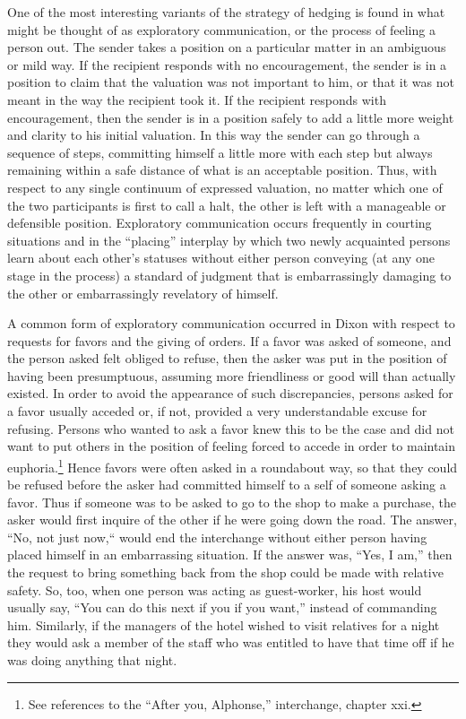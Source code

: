 \documentclass[twoside,symmetric,nobib,justified]{tufte-book}
\begin{document}
One of the most interesting variants of the strategy of hedging is found
in what might be thought of as exploratory communication, or the process
of feeling a person out. The sender takes a position on a particular
matter in an ambiguous or mild way. If the recipient responds with no
encouragement, the sender is in a position to claim that the valuation
was not important to him, or that it was not meant in the way the
recipient took it. If the recipient responds with encouragement, then
the sender is in a position safely to add a little more weight and
clarity to his initial valuation. In this way the sender can go through
a sequence of steps, committing himself a little more with each step but
always remaining within a safe distance of what is an acceptable
position. Thus, with respect to any single continuum of expressed
valuation, no matter which one of the two participants is first to call
a halt, the other is left with a manageable or defensible position.
Exploratory communication occurs frequently in courting situations and
in the ``placing'' interplay by which two newly acquainted persons learn
about each other's statuses without either person conveying (at any one
stage in the process) a standard of judgment that is embarrassingly
damaging to the other or embarrassingly revelatory of himself.

A common form of exploratory communication occurred in Dixon with
respect to requests for favors and the giving of orders. If a favor was
asked of someone, and the person asked felt obliged to refuse, then the
asker was put in the position of having been presumptuous, assuming more
friendliness or good will than actually existed. In order to avoid the
appearance of such discrepancies, persons asked for a favor usually
acceded or, if not, provided a very understandable excuse for refusing.
Persons who wanted to ask a favor knew this to be the case and did not
want to put others in the position of feeling forced to accede in order
to maintain euphoria.\footnote{See references to the ``After you,
  Alphonse,'' interchange, chapter xxi.} Hence favors were often asked
in a roundabout way, so that they could be refused before the asker had
committed himself to a self of someone asking a favor. Thus if someone
was to be asked to go to the shop to make a purchase, the asker would
first inquire of the other if he were going down the road. The answer,
``No, not just now,`` would end the interchange without either person
having placed himself in an embarrassing situation. If the answer was,
``Yes, I am,'' then the request to bring something back from the shop
could be made with relative safety. So, too, when one person was acting
as guest-worker, his host would usually say, ``You can do this next if
you if you want,'' instead of commanding him. Similarly, if the managers
of the hotel wished to visit relatives for a night they would ask a
member of the staff who was entitled to have that time off if he was
doing anything that night.
\end{document}
